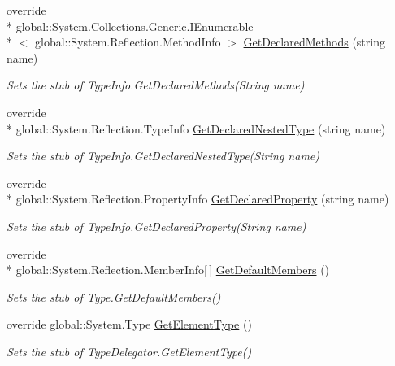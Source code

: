\begin{DoxyCompactItemize}
override \\*
global\-::\-System.\-Collections.\-Generic.\-I\-Enumerable\\*
$<$ global\-::\-System.\-Reflection.\-Method\-Info $>$ \hyperlink{class_system_1_1_reflection_1_1_fakes_1_1_stub_type_delegator_a988be57791704e5c95c9584787b32656}{Get\-Declared\-Methods} (string name)
\begin{DoxyCompactList}\small\item\em Sets the stub of Type\-Info.\-Get\-Declared\-Methods(\-String name)\end{DoxyCompactList}\item 
override \\*
global\-::\-System.\-Reflection.\-Type\-Info \hyperlink{class_system_1_1_reflection_1_1_fakes_1_1_stub_type_delegator_abfe5b9a21729afcf598dd66411d64cef}{Get\-Declared\-Nested\-Type} (string name)
\begin{DoxyCompactList}\small\item\em Sets the stub of Type\-Info.\-Get\-Declared\-Nested\-Type(\-String name)\end{DoxyCompactList}\item 
override \\*
global\-::\-System.\-Reflection.\-Property\-Info \hyperlink{class_system_1_1_reflection_1_1_fakes_1_1_stub_type_delegator_a05023340158477a0e74b1f191b8edd76}{Get\-Declared\-Property} (string name)
\begin{DoxyCompactList}\small\item\em Sets the stub of Type\-Info.\-Get\-Declared\-Property(\-String name)\end{DoxyCompactList}\item 
override \\*
global\-::\-System.\-Reflection.\-Member\-Info\mbox{[}$\,$\mbox{]} \hyperlink{class_system_1_1_reflection_1_1_fakes_1_1_stub_type_delegator_ab1c29c14ffdd08e98a57f985e0ccf64d}{Get\-Default\-Members} ()
\begin{DoxyCompactList}\small\item\em Sets the stub of Type.\-Get\-Default\-Members()\end{DoxyCompactList}\item 
override global\-::\-System.\-Type \hyperlink{class_system_1_1_reflection_1_1_fakes_1_1_stub_type_delegator_a66a63cfbf56772752c6f9dc1c5fcaa80}{Get\-Element\-Type} ()
\begin{DoxyCompactList}\small\item\em Sets the stub of Type\-Delegator.\-Get\-Element\-Type()\end{DoxyCompactList}\item 

\end{DoxyCompactItemize}
